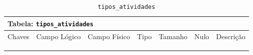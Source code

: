 \documentclass[12pt,a4paper]{article}
\begin{document}
\begin{center}
\begin{table}[h!]
	\caption{\texttt{tipos\_atividades}}
	\label{tabela:tiposAtividades}
	\begin{tabular}{|p{1cm}|p{1.5cm}|p{1.25cm}|p{1.25cm}|p{1.75cm}|p{1.25cm}|p{4.5cm}|}\hline	
		\multicolumn{7}{|p{16cm}|}{\cellcolor{cinzaClaro}  \centering Tabela: \texttt{tipos\_atividades}} \\ \hline %
		{\small Chaves} & {\small Campo Lógico} & {\small Campo Físico} & {\small Tipo} & {\small Tamanho} & {\small Nulo} & {\small Descrição}\\\hline %
		
		{\tiny } & {\tiny } & {\tiny } & {\tiny } & {\tiny } & {\tiny } &{\tiny }\\\hline
		{\tiny } & {\tiny } & {\tiny } & {\tiny } & {\tiny } & {\tiny } &{\tiny }\\\hline
		{\tiny } & {\tiny } & {\tiny } & {\tiny } & {\tiny } & {\tiny } &{\tiny }\\\hline
		
			
	\end{tabular}
\end{table}	
\end{center}
\end{document}

